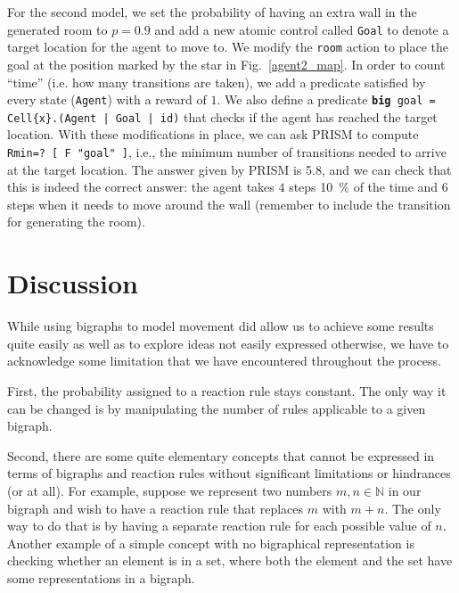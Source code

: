 \documentclass[runningheads]{llncs}
\begin{document}
For the second model, we set the probability of having an extra wall in the
generated room to $p = 0.9$ and add a new atomic control called \texttt{Goal} to
denote a target location for the agent to move to. We modify the \texttt{room}
action to place the goal at the position marked by the star in
Fig.~\ref{agent2_map}. In order to count ``time'' (i.e. how many transitions are
taken), we add a predicate satisfied by every state (\texttt{Agent}) with a
reward of $1$. We also define a predicate \texttt{\textbf{big} goal =
  Cell\{x\}.(Agent | Goal | id)} that checks if the agent has reached the target
location. With these modifications in place, we can ask PRISM to compute
\texttt{Rmin=? [ F "goal" ]}, i.e., the minimum number of transitions needed to
arrive at the target location. The answer given by PRISM is \num{5.8}, and we
can check that this is indeed the correct answer: the agent takes $4$ steps
\SI{10}{\percent} of the time and $6$ steps when it needs to move around the
wall (remember to include the transition for generating the room).

\section{Discussion}


While using bigraphs to model movement did allow us to achieve some results
quite easily as well as to explore ideas not easily expressed otherwise, we have
to acknowledge some limitation that we have encountered throughout the process.

First, the probability assigned to a reaction rule stays constant. The only way
it can be changed is by manipulating the number of rules applicable to a given
bigraph.

Second, there are some quite elementary concepts that cannot be
expressed in terms of bigraphs and reaction rules without significant
limitations or hindrances (or at all). For example, suppose we represent two
numbers $m, n \in \mathbb{N}$ in our bigraph and wish to have a reaction rule
that replaces $m$ with $m + n$. The only way to do that is by having a separate
reaction rule for each possible value of $n$. Another example of a simple
concept with no bigraphical representation is checking whether an element is in
a set, where both the element and the set have some representations in a
bigraph.
\end{document}
